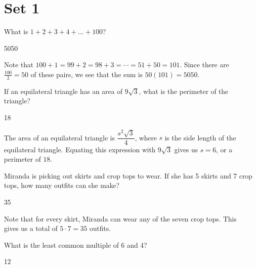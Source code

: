 \documentclass[11pt]{article}
\begin{document}
\section*{Set 1}
\begin{problem}
What is $1 + 2 + 3 + 4 + \dots + 100$?
\end{problem}

\begin{answer}
5050
\end{answer}

\begin{solution}
Note that $100+1=99+2=98+3=\cdots=51+50=101$. Since there are $\frac{100}{2}=50$ of these pairs, we see that the sum is $50(101)=\boxed{5050}$.
\end{solution}

\begin{problem}
If an equilateral triangle has an area of $9\sqrt{3}$, what is the perimeter of the triangle?
\end{problem}

\begin{answer}
18
\end{answer}

\begin{solution}
The area of an equilateral triangle is $\dfrac{s^2\sqrt{3}}{4}$, where $s$ is the side length of the equilateral triangle. Equating this expression with $9\sqrt{3}$ gives us $s=6$, or a perimeter of $\boxed{18}$.
\end{solution}

\begin{problem}
Miranda is picking out skirts and crop tops to wear. If she has 5 skirts and 7 crop tops, how many outfits can she make?
\end{problem}

\begin{answer}
35
\end{answer}

\begin{solution}
Note that for every skirt, Miranda can wear any of the seven crop tops. This gives us a total of $5 \cdot 7 = \boxed{35}$ outfits. 
\end{solution}

\begin{problem}
What is the least common multiple of 6 and 4?
\end{problem}

\begin{answer}
12
\end{answer}
\end{document}
